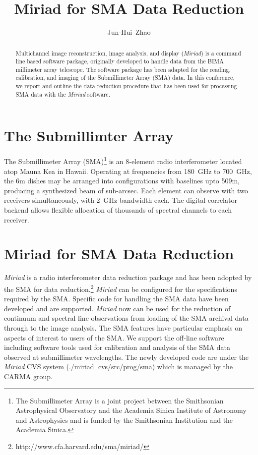 
\resetcounters




\title{Miriad for SMA Data Reduction}
\author{Jun-Hui~Zhao
}


\begin{abstract}
Multichannel image reconstruction, image analysis, and display ({\it Miriad}) is a command line based software package, originally developed to handle data from the BIMA millimeter array telescope. The software package has been adapted for the reading, calibration, and imaging of the Submillimeter Array (SMA)  data. In this conference, we report and outline the data reduction procedure that has been used for processing SMA data with the {\it Miriad} software. 	 
\end{abstract}

\section{The Submillimter Array}
The Submillimeter Array (SMA)\footnote{The Submillimeter Array is a joint project between the Smithsonian Astrophysical Observatory and the Academia Sinica Institute of Astronomy and Astrophysics and is funded by the Smithsonian Institution and the Academia Sinica.} is an 8-element radio interferometer located atop Mauna Kea in Hawaii. Operating at frequencies from 180~GHz to 700~GHz, the 6m dishes may be arranged into configurations with baselines upto 509m, producing a synthesized beam of sub-arcsec. Each element can observe with two receivers simultaneously, with 2~GHz bandwidth each. The digital correlator backend allows flexible allocation of thousands of spectral channels to each receiver.

\section{Miriad for SMA Data Reduction}
{\it Miriad} is a radio interferometer data reduction package \citep{stw95} and has been adopted by the SMA for data reduction.\footnote{http://www.cfa.harvard.edu/sma/miriad/} {\it Miriad} can be configured for the specifications required by the SMA. Specific code for handling the SMA data have been developed and are supported. {\it Miriad} now can be used for the reduction of continuum and spectral line observations from loading of the SMA archival data  through to the image analysis. The SMA features have particular emphasis on aspects of interest to users of the SMA. We support the off-line software including software tools used for calibration and analysis of the SMA data observed at submillimeter wavelengths. The newly developed code are under the {\it Miriad} CVS system (./miriad$_{-}$cvs/src/prog/sma) which is managed by the CARMA group.

